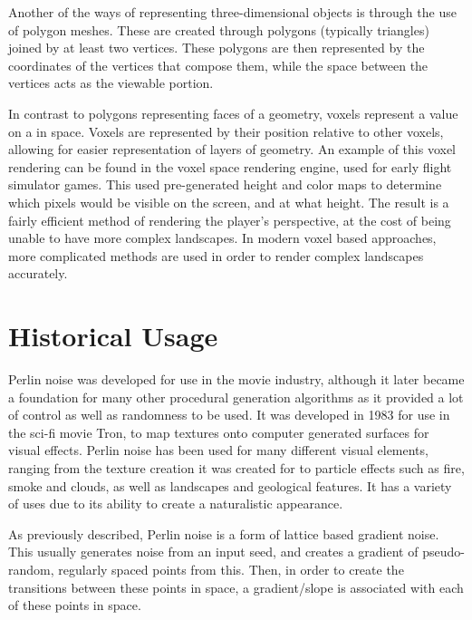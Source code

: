 \documentclass[10pt]{report}
\begin{document}
		Another of the ways of representing three-dimensional objects is through the use of polygon meshes. These are created through polygons (typically triangles) joined by at least two vertices. These polygons are then represented by the coordinates of the vertices that compose them, while the space between the vertices acts as the viewable portion.
		
		In contrast to polygons representing faces of a geometry, voxels represent a value on a in space. Voxels are represented by their position relative to other voxels, allowing for easier representation of layers of geometry. An example of this voxel rendering can be found in the voxel space rendering engine, used for early flight simulator games. This used pre-generated height and color maps to determine which pixels would be visible on the screen, and at what height. The result is a fairly efficient method of rendering the player's perspective, at the cost of being unable to have more complex landscapes. In modern voxel based approaches, more complicated methods are used in order to render complex landscapes accurately.
		
	\vspace{10pt}
	\let\clearpage\relax
	\chapter{Historical Usage}
		
		Perlin noise was developed for use in the movie industry, although it later became a foundation for many other procedural generation algorithms as it provided a lot of control as well as randomness to be used. It was developed in 1983 for use in the sci-fi movie Tron, to map textures onto computer generated surfaces for visual effects. Perlin noise has been used for many different visual elements, ranging from the texture creation it was created for to particle effects such as fire, smoke and clouds, as well as landscapes and geological features. It has a variety of uses due to its ability to create a naturalistic appearance.
		
		As previously described, Perlin noise is a form of lattice based gradient noise. This usually generates noise from an input seed, and creates a gradient of pseudo-random, regularly spaced points from this. Then, in order to create the transitions between these points in space, a gradient/slope is associated with each of these points in space.
		
		
\end{document}
